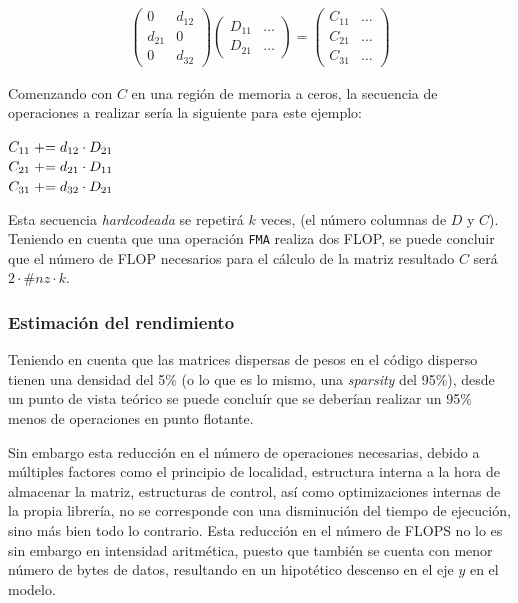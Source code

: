 \begin{gather}
    \begin{pmatrix}
        0 & d_{12}\\
        d_{21} & 0\\
        0 & d_{32}
    \end{pmatrix}	
    \begin{pmatrix}
        D_{11} & \dots\\
        D_{21} & \dots
    \end{pmatrix}
    =
    \begin{pmatrix}
        C_{11} & \dots\\
        C_{21} & \dots\\
        C_{31} & \dots
    \end{pmatrix}
    \label{eq:flops_sparsity_eq}
\end{gather}

Comenzando con $C$ en una región de memoria a ceros, la secuencia de operaciones a realizar sería la siguiente para este ejemplo:

\begin{center}
    $C_{11} \mathrel{+}= d_{12} \cdot D_{21}$\\
    $C_{21} \mathrel{+}= d_{21} \cdot D_{11}$\\
    $C_{31} \mathrel{+}= d_{32} \cdot D_{21}$\\
\end{center}

Esta secuencia \textit{hardcodeada} se repetirá $k$ veces, (el número columnas de $D$ y $C$). Teniendo en cuenta que una operación \texttt{FMA} realiza dos FLOP, se puede concluir que el número de FLOP necesarios para el cálculo de la matriz resultado $C$ será $2 \cdot \#nz \cdot k$.

\subsubsection{Estimación del rendimiento}
Teniendo en cuenta que las matrices dispersas de pesos en el código disperso tienen una densidad del 5\% (o lo que es lo mismo, una \textit{sparsity} del 95\%), desde un punto de vista teórico se puede concluír que se deberían realizar un 95\% menos de operaciones en punto flotante.

Sin embargo esta reducción en el número de operaciones necesarias, debido a múltiples factores como el principio de localidad, estructura interna a la hora de almacenar la matriz, estructuras de control, así como optimizaciones internas de la propia librería, no se corresponde con una disminución del tiempo de ejecución, sino más bien todo lo contrario. Esta reducción en el número de FLOPS no lo es sin embargo en intensidad aritmética, puesto que también se cuenta con menor número de bytes de datos, resultando en un hipotético descenso en el eje $y$ en el modelo.

